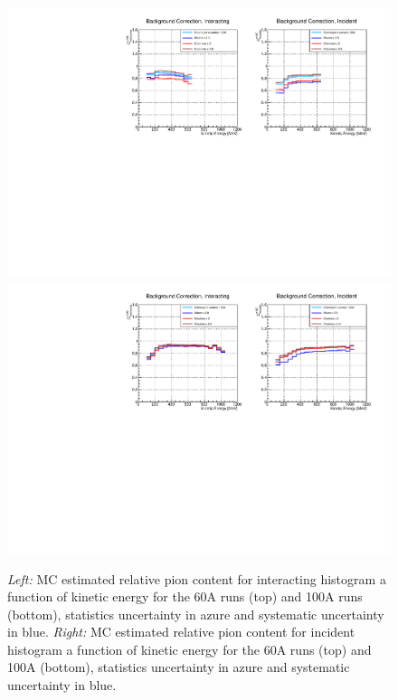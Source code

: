 \begin{figure}[p]
\centering
\includegraphics[width=\textwidth]{Chapter-6/Images/Bkg60A_inc_int.pdf}
\includegraphics[width=\textwidth]{Chapter-6/Images/Bkg100A_inc_int.pdf}
\caption{\emph{Left:} MC estimated relative pion content for interacting histogram a function of kinetic energy for the 60A runs (top) and 100A runs (bottom), statistics uncertainty in azure and systematic uncertainty in blue. \emph{Right:}  MC estimated relative pion content  for incident histogram a function of kinetic energy for the 60A runs (top)  and 100A (bottom), statistics uncertainty in azure and systematic uncertainty in blue.}
\label{fig:CorrectionsBeam}
\end{figure}



